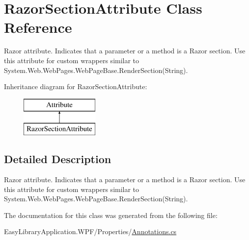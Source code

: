 \hypertarget{class_razor_section_attribute}{}\section{Razor\+Section\+Attribute Class Reference}
\label{class_razor_section_attribute}


Razor attribute. Indicates that a parameter or a method is a Razor section. Use this attribute for custom wrappers similar to {\ttfamily System.\+Web.\+Web\+Pages.\+Web\+Page\+Base.\+Render\+Section(\+String)}.  


Inheritance diagram for Razor\+Section\+Attribute\+:\begin{figure}[H]
\begin{center}
\leavevmode
\includegraphics[height=2.000000cm]{class_razor_section_attribute}
\end{center}
\end{figure}


\subsection{Detailed Description}
Razor attribute. Indicates that a parameter or a method is a Razor section. Use this attribute for custom wrappers similar to {\ttfamily System.\+Web.\+Web\+Pages.\+Web\+Page\+Base.\+Render\+Section(\+String)}. 



The documentation for this class was generated from the following file\+:\begin{DoxyCompactItemize}
\item 
Easy\+Library\+Application.\+W\+P\+F/\+Properties/\mbox{\hyperlink{_annotations_8cs}{Annotations.\+cs}}\end{DoxyCompactItemize}
